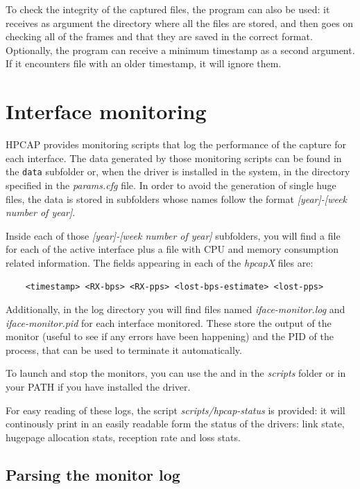 \documentclass[a4paper,oneside]{hpman}
\begin{document}
To check the integrity of the captured files, the program  can also be used: it receives as argument the directory where all the files are stored, and then goes on checking all of the frames and that they are saved in the correct format. Optionally, the program can receive a minimum timestamp as a second argument. If it encounters file with an older timestamp, it will ignore them.

\section{Interface monitoring}
\label{sec:Monitoring}

HPCAP provides monitoring scripts that log the performance of the capture for each interface. The data generated by those monitoring scripts can be found in the \texttt{data} subfolder or, when the driver is installed in the system, in the directory specified in the \textit{params.cfg} file. In order to avoid the generation of single huge files, the data is stored in subfolders whose names follow the format \textit{[year]-[week number of year]}.

Inside each of those \textit{[year]-[week number of year]} subfolders, you will find a file for each of the active interface plus a file with CPU and memory consumption related information. The fields appearing in each of the \textit{hpcapX} files are:
\begin{verbatim}
    <timestamp> <RX-bps> <RX-pps> <lost-bps-estimate> <lost-pps>
\end{verbatim}

Additionally, in the log directory you will find files named \textit{iface-monitor.log} and \textit{iface-monitor.pid} for each interface monitored. These store the output of the monitor (useful to see if any errors have been happening) and the PID of the process, that can be used to terminate it automatically.

To launch and stop the monitors, you can use the  and  in the \textit{scripts} folder or in your PATH if you have installed the driver.

For easy reading of these logs, the script \textit{scripts/hpcap-status} is provided: it will continously print in an easily readable form the status of the drivers: link state, hugepage allocation stats, reception rate and loss stats.

\subsection{Parsing the monitor log}
\end{document}
